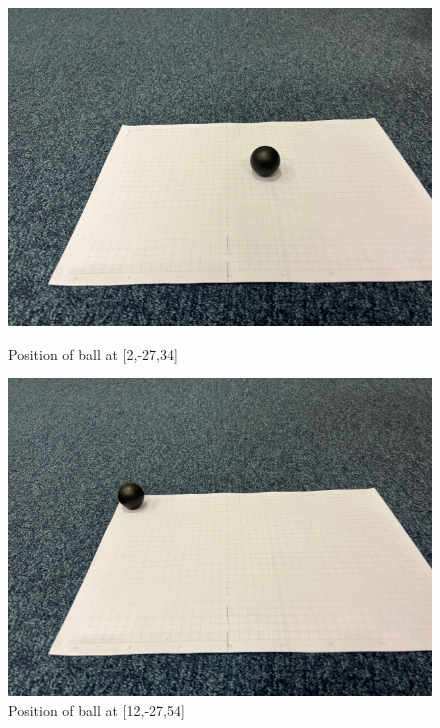\documentclass{article}
\begin{document}
\begin{figure}[h!] 
  \label{ fig7} 
  \begin{minipage}[b]{0.5\linewidth}
    \centering
    \includegraphics[width=.2\textheight]{1.jpg} 
    \caption{\label{fig:11}Position of ball at [2,-27,34] } 
    \vspace{4ex}
  \end{minipage}%
  \begin{minipage}[b]{0.5\linewidth}
    \centering
    \includegraphics[width=.2\textheight]{2.jpg} 
    \caption{\label{fig:22}Position of ball at [12,-27,54]} 
    \vspace{4ex}
  \end{minipage} 
  \begin{minipage}[b]{0.5\linewidth}

\end{minipage}
\end{figure}
\end{document}
